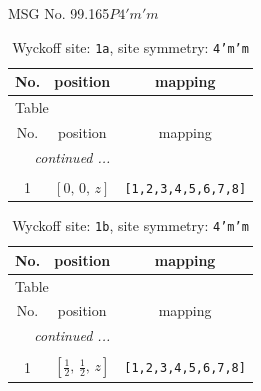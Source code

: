 \documentclass[fleqn,8pt]{jsarticle}
\begin{document}
\setcounter{MaxMatrixCols}{32}

\renewcommand{\tablename}{Table~}
\renewcommand{\figurename}{Figure~}
\begin{center}
\LARGE
MSG No. 99.165\quad$P4'm'm$
\end{center}
\renewcommand{\arraystretch}{1.2}
\begin{longtable}{ccc}
\caption{Wyckoff site: {\tt 1a}, site symmetry: {\tt 4'm'm}}
 \\
 \hline \hline
No. & position & mapping \\ \hline \endfirsthead

\multicolumn{2}{l}{\tablename\ \thetable{}} \\
 \hline \hline
No. & position & mapping \\ \hline \endhead

 \hline \hline
\multicolumn{2}{r}{\footnotesize\it continued ...} \\ \endfoot

 \hline \hline
\multicolumn{2}{r}{} \\ \endlastfoot

1 & $\left[ 0,\, 0,\, z \right]$ & {\tt [1,2,3,4,5,6,7,8]} \\
\end{longtable}
\renewcommand{\arraystretch}{1.2}
\begin{longtable}{ccc}
\caption{Wyckoff site: {\tt 1b}, site symmetry: {\tt 4'm'm}}
 \\
 \hline \hline
No. & position & mapping \\ \hline \endfirsthead

\multicolumn{2}{l}{\tablename\ \thetable{}} \\
 \hline \hline
No. & position & mapping \\ \hline \endhead

 \hline \hline
\multicolumn{2}{r}{\footnotesize\it continued ...} \\ \endfoot

 \hline \hline
\multicolumn{2}{r}{} \\ \endlastfoot

1 & $\left[ \frac{1}{2},\, \frac{1}{2},\, z \right]$ & {\tt [1,2,3,4,5,6,7,8]} \\
\end{longtable}
\renewcommand{\arraystretch}{1.2}
\end{document}
